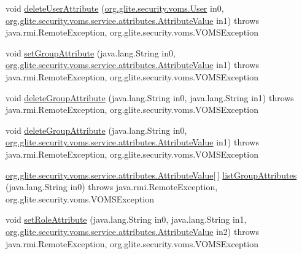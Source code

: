 \begin{DoxyCompactItemize}
\item 
void \hyperlink{classorg_1_1glite_1_1security_1_1voms_1_1service_1_1attributes_1_1VOMSAttributesSoapBindingSkeleton_ae5ca84f893db851e845f82b901a9f08b}{deleteUserAttribute} (\hyperlink{classorg_1_1glite_1_1security_1_1voms_1_1User}{org.glite.security.voms.User} in0, \hyperlink{classorg_1_1glite_1_1security_1_1voms_1_1service_1_1attributes_1_1AttributeValue}{org.glite.security.voms.service.attributes.AttributeValue} in1)  throws java.rmi.RemoteException, org.glite.security.voms.VOMSException     
\item 
void \hyperlink{classorg_1_1glite_1_1security_1_1voms_1_1service_1_1attributes_1_1VOMSAttributesSoapBindingSkeleton_a5780ef9aa0fbca687dbccf2af17f9a0b}{setGroupAttribute} (java.lang.String in0, \hyperlink{classorg_1_1glite_1_1security_1_1voms_1_1service_1_1attributes_1_1AttributeValue}{org.glite.security.voms.service.attributes.AttributeValue} in1)  throws java.rmi.RemoteException, org.glite.security.voms.VOMSException     
\item 
void \hyperlink{classorg_1_1glite_1_1security_1_1voms_1_1service_1_1attributes_1_1VOMSAttributesSoapBindingSkeleton_ada7b88369156ea23fc61e40c254f6228}{deleteGroupAttribute} (java.lang.String in0, java.lang.String in1)  throws java.rmi.RemoteException, org.glite.security.voms.VOMSException     
\item 
void \hyperlink{classorg_1_1glite_1_1security_1_1voms_1_1service_1_1attributes_1_1VOMSAttributesSoapBindingSkeleton_ab34227e9e1a0dc4049a820558c9d4058}{deleteGroupAttribute} (java.lang.String in0, \hyperlink{classorg_1_1glite_1_1security_1_1voms_1_1service_1_1attributes_1_1AttributeValue}{org.glite.security.voms.service.attributes.AttributeValue} in1)  throws java.rmi.RemoteException, org.glite.security.voms.VOMSException     
\item 
\hyperlink{classorg_1_1glite_1_1security_1_1voms_1_1service_1_1attributes_1_1AttributeValue}{org.glite.security.voms.service.attributes.AttributeValue}\mbox{[}$\,$\mbox{]} \hyperlink{classorg_1_1glite_1_1security_1_1voms_1_1service_1_1attributes_1_1VOMSAttributesSoapBindingSkeleton_a6f6550302d3b00bcc871812ea9e142fa}{listGroupAttributes} (java.lang.String in0)  throws java.rmi.RemoteException, org.glite.security.voms.VOMSException     
\item 
void \hyperlink{classorg_1_1glite_1_1security_1_1voms_1_1service_1_1attributes_1_1VOMSAttributesSoapBindingSkeleton_abe960bf6368ac106e4b308f895e81428}{setRoleAttribute} (java.lang.String in0, java.lang.String in1, \hyperlink{classorg_1_1glite_1_1security_1_1voms_1_1service_1_1attributes_1_1AttributeValue}{org.glite.security.voms.service.attributes.AttributeValue} in2)  throws java.rmi.RemoteException, org.glite.security.voms.VOMSException     

\end{DoxyCompactItemize}
